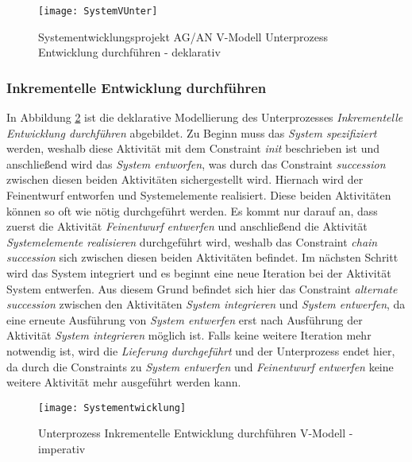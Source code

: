 \begin{figure}[!htbp]
\begin{center}
  \texttt{[image: SystemVUnter]} %
  \caption{Systementwicklungsprojekt AG/AN  V-Modell Unterprozess Entwicklung durchführen - deklarativ}
  \label{fig:SystemVUnter}
\end{center}
\end{figure}



\subsubsection{Inkrementelle Entwicklung durchführen}
In Abbildung \ref{fig:Systementwicklung} ist die deklarative Modellierung des Unterprozesses \textit{Inkrementelle Entwicklung durchführen} abgebildet. \newline
Zu Beginn muss das \textit{System spezifiziert} werden, weshalb diese Aktivität mit dem Constraint \textit{init} beschrieben ist und anschließend wird das \textit{System entworfen}, was durch das Constraint \textit{succession} zwischen diesen beiden Aktivitäten sichergestellt wird.\newline
Hiernach wird der Feinentwurf entworfen und Systemelemente realisiert. Diese beiden Aktivitäten können so oft wie nötig durchgeführt werden. Es kommt nur darauf an, dass zuerst die Aktivität  \textit{Feinentwurf entwerfen} und anschließend die Aktivität \textit{Systemelemente realisieren} durchgeführt wird, weshalb das Constraint \textit{chain succession} sich zwischen diesen beiden Aktivitäten befindet. \newline
Im nächsten Schritt wird das System integriert und es beginnt eine neue Iteration bei der Aktivität System entwerfen. Aus diesem Grund befindet sich hier das Constraint \textit{alternate succession} zwischen den Aktivitäten \textit{System integrieren} und \textit{System entwerfen}, da eine erneute Ausführung von \textit{System entwerfen} erst nach Ausführung der Aktivität \textit{System integrieren} möglich ist. \newline
Falls keine weitere Iteration mehr notwendig ist, wird die \textit{Lieferung durchgeführt} und der Unterprozess endet hier, da durch die Constraints zu \textit{System entwerfen} und \textit{Feinentwurf entwerfen} keine weitere Aktivität mehr ausgeführt werden kann. \newline
\begin{figure}[!htbp]
\begin{center}
  \texttt{[image: Systementwicklung]} %
  \caption{Unterprozess Inkrementelle Entwicklung durchführen V-Modell - imperativ}
  \label{fig:Systementwicklung}
\end{center}
\end{figure}



